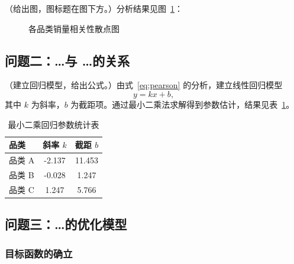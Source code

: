\documentclass[a4paper, zihao=-4, fontset=windows]{ctexart}
\begin{document}
（给出图，图标题在图下方。）分析结果见图~\ref{fig:scatter}：

\begin{figure}[htbp]
  \centering
  \caption{各品类销量相关性散点图}
  \label{fig:scatter}
\end{figure}

\subsection{问题二：\ldots 与 \ldots 的关系}

（建立回归模型，给出公式。）由式~\eqref{eq:pearson} 的分析，建立线性回归模型
\begin{equation}
  y = kx + b,
  \label{eq:linear}
\end{equation}
其中 $k$ 为斜率，$b$ 为截距项。通过最小二乘法求解得到参数估计，结果见表~\ref{tab:reg}。

\begin{table}[htbp]
  \centering
  \caption{最小二乘回归参数统计表}
  \label{tab:reg}
  \begin{tabular}{lcc}
    \toprule
    品类 & 斜率 $k$ & 截距 $b$ \\
    \midrule
    品类 A & -2.137 & 11.453 \\
    品类 B & -0.028 & 1.247  \\
    品类 C &  1.247 & 5.766  \\
    \bottomrule
  \end{tabular}
\end{table}

\subsection{问题三：\ldots 的优化模型}

\subsubsection{目标函数的确立}
\end{document}
